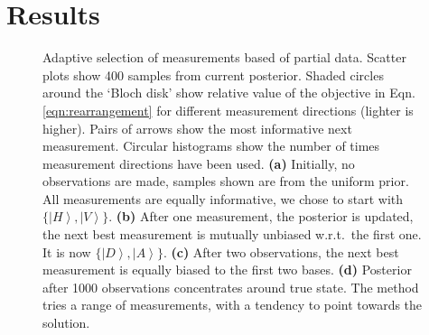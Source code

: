 \section{Results}

\begin{figure}

	\caption[Illustration of adaptive tomography on a sinlge-photon system]{Adaptive selection of measurements based of partial data. Scatter plots show 400 samples from current posterior. Shaded circles around the `Bloch disk' show relative value of the objective in Eqn.\,\eqref{eqn:rearrangement} for different measurement directions (lighter is higher). Pairs of arrows show the most informative next measurement. Circular histograms show the number of times measurement directions have been used. \textbf{(a)}  Initially, no observations are made, samples shown are from the uniform prior. All measurements are equally informative, we chose to start with $\{\left\vert H\right\rangle,\left\vert V\right\rangle\}$. \textbf{(b)}  After one measurement, the posterior is updated, the next best measurement is mutually unbiased w.r.t.\ the first one. It is now $\{\left\vert D\right\rangle,\left\vert A\right\rangle\}$. \textbf{(c)} After two observations, the next best measurement is equally biased to the first two bases. \textbf{(d)} Posterior after 1000 observations concentrates around true state. The method tries a range of measurements, with a tendency to point towards the solution.
	\label{fig:Bloch disk}}
\end{figure}

